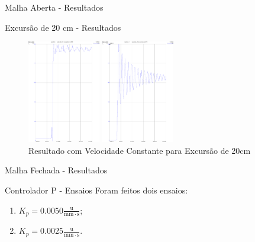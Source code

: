 \documentclass[10pt]{beamer}
\begin{document}
\begin{frame}[fragile]{Malha Aberta - Resultados}

\begin{block}{Excursão de 20 cm - Resultados}

\begin{figure}[!htb]
    \centering
    \begin{minipage}{.45\textwidth}
        \centering
        \includegraphics[width=1\linewidth,height=4.5cm]{figures/resultados/malha_aberta_2/percurso20cmBom.pdf}
        \caption{Resultado com Velocidade Modelada para Excursão de 20cm}
        \label{percurso20cmBom}
    \end{minipage}%
    \hspace{0.1cm}
    \begin{minipage}{0.45\textwidth}
        \centering
        \includegraphics[width=1\linewidth,height=4.5cm]{figures/resultados/malha_aberta_2/percurso20cmRuim.pdf}
        \caption{Resultado com Velocidade Constante para Excursão de 20cm}
        \label{percurso20cmRuim}
    \end{minipage}
\end{figure}
\end{block}
\end{frame}

\begin{frame}[fragile]{Malha Fechada - Resultados}
\begin{block}{Controlador P - Ensaios}
Foram feitos dois ensaios:
\begin{enumerate}
	\item $K_p = 0.0050 \frac{\mathrm{u}}{\mathrm{mm}\cdot\mathrm{s}}$;
	\item $K_p = 0.0025 \frac{\mathrm{u}}{\mathrm{mm}\cdot\mathrm{s}}$.
\end{enumerate}
\end{block}
\end{frame}
\end{document}
